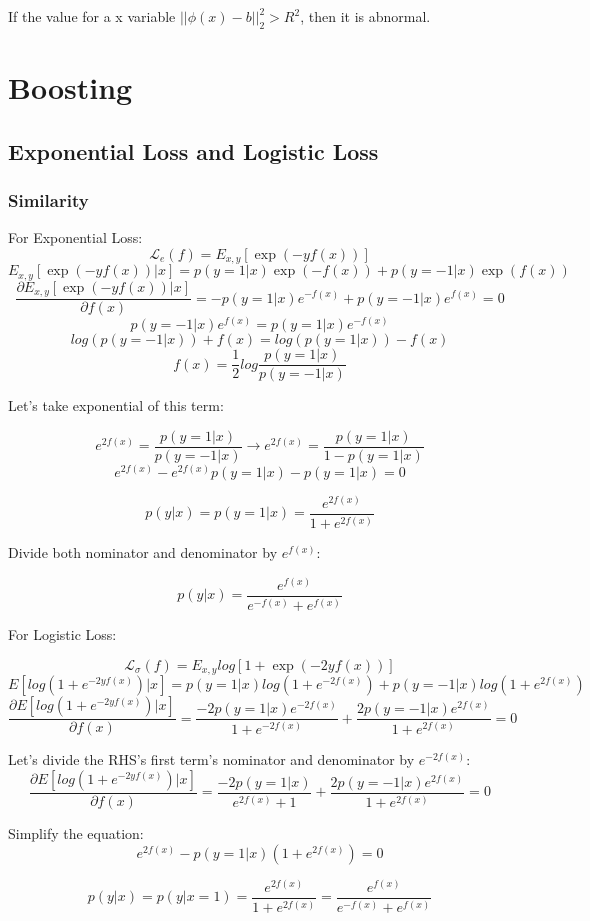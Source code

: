 \documentclass[letter,11pt]{article}
\begin{document}
	If the value for a x variable $||\phi(x) - b||_2^2 > R^2$, then it is abnormal.
	
	
	
	\section{Boosting}
	\subsection{Exponential Loss and Logistic Loss}
	\subsubsection{Similarity}
	For Exponential Loss:
	$$ \mathcal{L}_e(f) = E_{x,y}[\exp(-yf(x))]$$
	$$ E_{x,y}[\exp(-yf(x))|x] = p(y=1|x)\exp(-f(x))+p(y=-1|x)\exp(f(x))$$
	$$\frac{\partial E_{x,y}[\exp(-yf(x))|x]}{\partial f(x)} = -p(y=1|x)e^{-f(x)}+p(y=-1|x)e^{f(x)} = 0$$
	$$p(y=-1|x)e^{f(x)} = p(y=1|x)e^{-f(x)}$$
	$$log(p(y=-1|x)) + f(x) = log(p(y=1|x)) - f(x)$$
	$$f(x) = \frac{1}{2} log \frac{p(y=1|x)}{p(y=-1|x)}$$
	
	Let's take exponential of this term:
	
	$$e^{2f(x)}= \frac{p(y=1|x)}{p(y=-1|x)} \rightarrow  e^{2f(x)}= \frac{p(y=1|x)}{1 - p(y=1|x)}$$
	$$e^{2f(x)} - e^{2f(x)}p(y=1|x) - p(y=1|x) = 0$$
	
	$$p(y|x) = p(y=1|x) = \frac{e^{2f(x)}}{1 + e^{2f(x)}}$$
	
	Divide both nominator and denominator by $e^{f(x)}$:
	
	$$p(y|x) = \frac{e^{f(x)}}{e^{-f(x)} + e^{f(x)}}$$

	
	For Logistic Loss:
	
	$$ \mathcal{L}_\sigma(f) = E_{x,y}log[1 + \exp(-2yf(x))]$$
	$$E[log(1 + e^{-2yf(x)})|x] = p(y = 1|x) log(1 + e^{-2f(x)}) + p(y=-1|x)log(1 + e^{2f(x)})$$
	$$\frac{\partial E[log(1 + e^{-2yf(x)})|x]}{\partial f(x)} = \frac{-2p(y=1|x)e^{-2f(x)}}{1 + e^{-2f(x)}} + \frac{2p(y = -1|x)e^{2f(x)}}{1 + e^{2f(x)}} = 0$$
	
	Let's divide the RHS's first term's nominator and denominator by $e^{-2f(x)}$:
	$$\frac{\partial E[log(1 + e^{-2yf(x)})|x]}{\partial f(x)} = \frac{-2p(y=1|x)}{e^{2f(x)}+1} + \frac{2p(y = -1|x)e^{2f(x)}}{1 + e^{2f(x)}} = 0$$
	
	Simplify the equation:
	$$e^{2f(x)} - p(y=1|x)(1+e^{2f(x)}) = 0$$
	
	$$p(y|x) = p(y|x=1) = \frac{e^{2f(x)}}{1+e^{2f(x)}} = \frac{e^{f(x)}}{e^{-f(x)} + e^{f(x)}}$$
\end{document}
